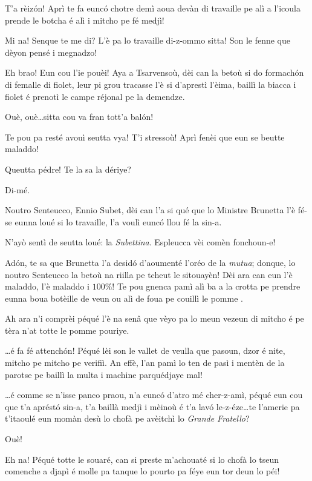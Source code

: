 \begin{drama}
\Laurentspeaks T'a rèiz\'on! Aprì te fa eunc\'o chotre demì aoua devàn di travaille pe alì a l'icoula prende le botcha é alì i mitcho pe fé medjì!

\Pierrespeaks Mi na! Senque te me di? L'è pa lo travaille di-z-ommo sitta! Son le fenne que dèyon pensé i megnadzo!

\Laurentspeaks {} Eh brao! Eun cou l'ie pouèi! Aya a Tsarvensoù, dèi can la betoù si do formach\'on di femalle di fiolet, leur pi grou tracasse l'è si d'aprestì l'èima, baillì la biacca i fiolet é prenotì le campe réjonal pe la demendze.

\Pierrespeaks Ouè, ouè\ldots sitta cou va fran tott'a bal\'on!

\Laurentspeaks Te pou pa resté avouì seutta vya! T'i stressoù! Aprì fenèi que eun se beutte maladdo!

\Pierrespeaks Queutta pédre! Te la sa la dériye?

\Laurentspeaks Di-mé.

\Pierrespeaks Noutro Senteucco, Ennio Subet, dèi can l'a si qué que lo Ministre Brunetta l'è fé-se eunna loué si lo travaille, l'a voulì eunc\'o llou fé la sin-a.

\Laurentspeaks N'ayò sentì de seutta loué: la \textit{Subettina}. Espleucca vèi comèn fonchoun-e!

\Pierrespeaks Ad\'on, te sa que Brunetta l'a desid\'o d'aoumenté l'oréo de la \textit{mutua}; donque, lo noutro Senteucco la betoù na riilla pe tcheut le sitouayèn! Dèi ara can eun l'è maladdo, l'è maladdo i $100\%$! Te pou gnenca pamì alì ba a la crotta pe prendre eunna boua botèille de veun ou alì de foua pe couillì le pomme \mela .

\Laurentspeaks Ah ara n'i comprèi péqué l'è na senâ que vèyo pa lo meun vezeun di mitcho é pe tèra n'at totte le pomme pouriye.

\Pierrespeaks \ldots é fa fé attench\'on! Péqué lèi  son le vallet de veulla que pasoun, dzor é nite, mitcho pe mitcho pe verifiì. An effè, l'an pamì lo ten de pasì i mentèn de la parotse pe baillì la multa i machine parquédjaye mal!

\Laurentspeaks \ldots é comme se n'isse panco praou, n'a eunc\'o d'atro mé cher-z-amì, péqué eun cou que t'a aprést\'o sin-a, t'a baillà medjì i mèinoù é t'a lav\'o le-z-éze\ldots te l'amerie pa t'itaoulé eun momàn desù lo chofà pe avèitchì lo \textit{Grande Fratello}?

\Pierrespeaks Ouè!

\Laurentspeaks Eh na! Péqué totte le souaré, can si preste m'achouaté si lo chofà lo tseun comenche a djapì é molle pa tanque lo pourto pa féye eun tor deun lo péi!


\end{drama}
